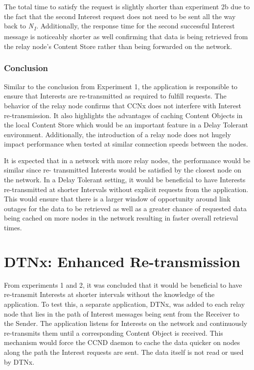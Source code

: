 \documentclass[a4paper,12pt]{report}      %
\begin{document}
The total time to satisfy the request is slightly shorter than experiment 2b due to the fact that the second
Interest request does not need to be sent all the way back to \emph{N\textsubscript{1}}. Additionally, the response time for
the second successful Interest message is noticeably shorter as well confirming that data is being
retrieved from the relay node's Content Store rather than being forwarded on the network.

\subsubsection{Conclusion}

Similar to the conclusion from Experiment 1, the application is responsible to ensure that Interests are
re-transmitted as required to fulfill requests. The behavior of the relay node confirms that CCNx does
not interfere with Interest re-transmission. It also highlights the advantages of caching Content Objects
in the local Content Store which would be an important feature in a Delay Tolerant environment.
Additionally, the introduction of a relay node does not hugely impact performance when tested at
similar connection speeds between the nodes.

It is expected that in a network with more relay nodes, the performance would be similar since re-
transmitted Interests would be satisfied by the closest node on the network. In a Delay Tolerant setting,
it would be beneficial to have Interests re-transmitted at shorter Intervals without explicit requests from
the application. This would ensure that there is a larger window of opportunity around link outages for
the data to be retrieved as well as a greater chance of requested data being cached on more nodes in the
network resulting in faster overall retrieval times.


\pagebreak
\section{DTNx: Enhanced Re-transmission}

From experiments 1 and 2, it was concluded that it would be beneficial to have re-transmit Interests at
shorter intervals without the knowledge of the application. To test this, a separate application, DTNx,
was added to each relay node that lies in the path of Interest messages being sent from the Receiver to
the Sender. The application listens for Interests on the network and continuously re-transmits them until
a corresponding Content Object is received. This mechanism would force the CCND daemon to cache
the data quicker on nodes along the path the Interest requests are sent. The data itself is not read or used
by DTNx.
\end{document}
